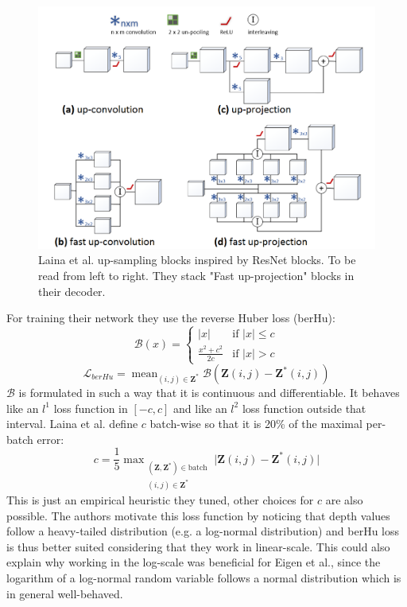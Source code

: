 \begin{figure}
\centering
\includegraphics[scale=0.4]{figs/Laina}
\caption{Laina et al. \cite{Laina} up-sampling blocks inspired by ResNet blocks. To be read from left to right. They stack "Fast up-projection" blocks in their decoder. \label{fig:Laina}}
\end{figure}

For training their network they use the reverse Huber loss (berHu):
\begin{equation}
	\mathcal{B}(x) = 
	\begin{cases}
		|x| & \text{if } |x| \leq c \\
		\frac{x^{2} + c^{2}}{2c} & \text{if } |x| > c
	\end{cases}
\end{equation}
\[
	\mathcal{L}_{berHu} = \mathop{\text{mean}}_{(i, j) \in \mathbf{Z}^{*}} \mathcal{B}(\mathbf{Z}(i, j) - \mathbf{Z}^{*}(i, j))
\]
$\mathcal{B}$ is formulated in such a way that it is continuous and differentiable.
It behaves like an $l^{1}$ loss function in $[-c, c]$ and like an $l^{2}$ loss function outside that interval.
Laina et al. define $c$ batch-wise so that it is 20\% of the maximal per-batch error:
\[
	c = \frac{1}{5} \mathop{\text{max}}_{
		\substack{
			(\mathbf{Z}, \mathbf{Z}^{*}) \in \text{batch} \\
			(i, j) \in \mathbf{Z}^{*}
		}
	} \big| \mathbf{Z}(i, j) - \mathbf{Z}^{*}(i, j) \big|
\]
This is just an empirical heuristic they tuned, other choices for $c$ are also possible.
The authors motivate this loss function by noticing that depth values follow a heavy-tailed distribution (e.g. a log-normal distribution) and berHu loss is thus better suited considering that they work in linear-scale.
This could also explain \cite{Laina} why working in the log-scale was beneficial for Eigen et al., since the logarithm of a log-normal random variable follows a normal distribution which is in general well-behaved.

